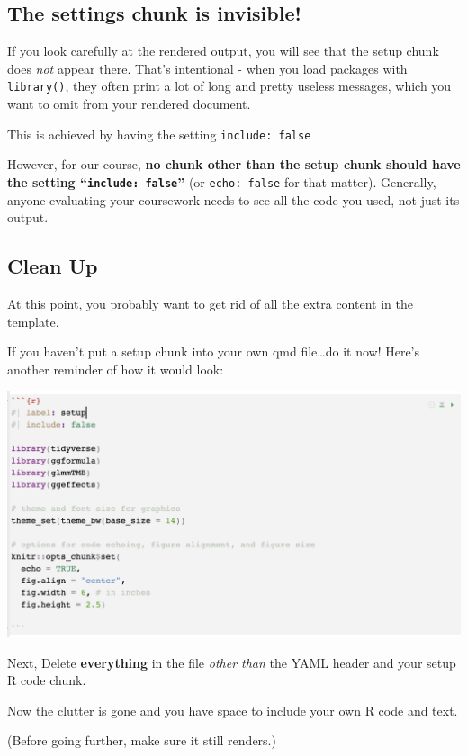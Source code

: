 \documentclass[
  letterpaper,
  DIV=11,
  numbers=noendperiod]{scrreprt}
\theoremstyle{remark}
\begin{document}
\subsection{The settings chunk is
invisible!}\label{the-settings-chunk-is-invisible}

If you look carefully at the rendered output, you will see that the
setup chunk does \emph{not} appear there. That's intentional - when you
load packages with \texttt{library()}, they often print a lot of long
and pretty useless messages, which you want to omit from your rendered
document.

This is achieved by having the setting \texttt{include:\ false}

However, for our course, \textbf{no chunk other than the setup chunk
should have the setting ``\texttt{include:\ false}''} (or
\texttt{echo:\ false} for that matter). Generally, anyone evaluating
your coursework needs to see all the code you used, not just its output.

\subsection{Clean Up}\label{clean-up}

At this point, you probably want to get rid of all the extra content in
the template.

If you haven't put a setup chunk into your own qmd file\ldots do it now!
Here's another reminder of how it would look:

\includegraphics[width=0.8\linewidth,height=\textheight,keepaspectratio]{images/setup-chunk-2.png}

Next, Delete \textbf{everything} in the file \emph{other than} the YAML
header and your setup R code chunk.

Now the clutter is gone and you have space to include your own R code
and text.

(Before going further, make sure it still renders.)
\end{document}
